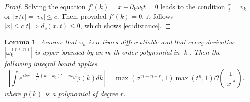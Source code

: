 \documentclass[notitlepage, prx, preprint, amsmath,superscriptaddress,amssymb]{revtex4-1}
\newtheorem{lemma}{Lemma}[section]
\begin{document}
\begin{proof}
Solving the equation $f'(k)=x - \partial_k \omega_k t = 0$ leads to the condition $\frac{x}{t} = v_k$ or  $|x/t|=|v_k|\leq c$. Then, provided $f'(k)=0$, it follows $|x|\leq c|t|\Rightarrow d_c(x,t)\leq 0$, which shows \eqref{eq:distance}.
\end{proof}


\begin{lemma}
\label{lemma:bounds}
Assume that $\omega_k$ is $n$-times differentiable and  that every derivative $|\omega_k^{(r\leq n)}|$ is upper bounded by an $m$-th order polynomial in $|k|$. Then the following integral bound applies
\begin{equation}
\left|\int e^{i k x - \frac{1}{\sigma^2}{(k-k_0)^2} - i \omega_k t} p(k)dk\right|
=\max(\sigma^{m+n + r},1) \max(t^n,1) \mathcal{O}\left(\frac{1}{|x|^n}\right).
\end{equation} where $p(k)$ is a polynomial of degree $r.$
\end{lemma}
\end{document}
